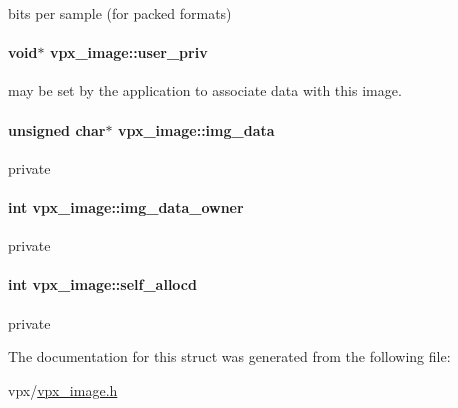 \label{structvpx__image_a53a02fad822151eb8eeb2f64f195e1f6}
bits per sample (for packed formats) \hypertarget{structvpx__image_a28ae6c046dfca87de4fca4e67cab563d}{
\paragraph[{user\-\_\-priv}]{\setlength{\rightskip}{0pt plus 5cm}void$\ast$ {\bf vpx\-\_\-image\-::user\-\_\-priv}}}
\label{structvpx__image_a28ae6c046dfca87de4fca4e67cab563d}
may be set by the application to associate data with this image. \hypertarget{structvpx__image_a3c9b7a7a68e4a9665b47433a1e96d78b}{
\paragraph[{img\-\_\-data}]{\setlength{\rightskip}{0pt plus 5cm}unsigned char$\ast$ {\bf vpx\-\_\-image\-::img\-\_\-data}}}
\label{structvpx__image_a3c9b7a7a68e4a9665b47433a1e96d78b}
private \hypertarget{structvpx__image_a4d2c8d41b67f7d3f3114212a8d8afdce}{
\paragraph[{img\-\_\-data\-\_\-owner}]{\setlength{\rightskip}{0pt plus 5cm}int {\bf vpx\-\_\-image\-::img\-\_\-data\-\_\-owner}}}
\label{structvpx__image_a4d2c8d41b67f7d3f3114212a8d8afdce}
private \hypertarget{structvpx__image_a33e8c75d8efc5d4f389e8fc09283a4cc}{
\paragraph[{self\-\_\-allocd}]{\setlength{\rightskip}{0pt plus 5cm}int {\bf vpx\-\_\-image\-::self\-\_\-allocd}}}
\label{structvpx__image_a33e8c75d8efc5d4f389e8fc09283a4cc}
private 

\-The documentation for this struct was generated from the following file\-:\begin{DoxyCompactItemize}
\item 
vpx/\hyperlink{vpx__image_8h}{vpx\-\_\-image.\-h}\end{DoxyCompactItemize}
